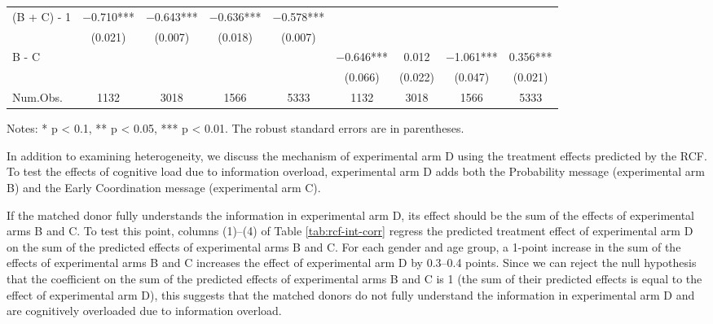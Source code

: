 \documentclass[
  lualatex,
  11pt,
  a4paper
]{article}
\begin{document}
\begin{table}
\begin{threeparttable}
\begin{tabular}[t]{lcccccccc}
\hspace{1em}(B + C) - 1 & \num{-0.710}*** & \num{-0.643}*** & \num{-0.636}*** & \num{-0.578}*** &  &  &  & \\
\hspace{1em} & (\num{0.021}) & (\num{0.007}) & (\num{0.018}) & (\num{0.007}) &  &  &  & \\
\hspace{1em}B - C &  &  &  &  & \num{-0.646}*** & \num{0.012} & \num{-1.061}*** & \num{0.356}***\\
\hspace{1em} &  &  &  &  & (\num{0.066}) & (\num{0.022}) & (\num{0.047}) & (\num{0.021})\\
\midrule
Num.Obs. & \num{1132} & \num{3018} & \num{1566} & \num{5333} & \num{1132} & \num{3018} & \num{1566} & \num{5333}\\
\bottomrule
\end{tabular}
\begin{tablenotes}
\item Notes: * p < 0.1, ** p < 0.05, *** p < 0.01. The robust standard errors are in parentheses. 
\end{tablenotes}
\end{threeparttable}
\end{table}

In addition to examining heterogeneity, we discuss the mechanism of experimental arm D using the treatment effects predicted by the RCF. To test the effects of cognitive load due to information overload, experimental arm D adds both the Probability message (experimental arm B) and the Early Coordination message (experimental arm C).

If the matched donor fully understands the information in experimental arm D, its effect should be the sum of the effects of experimental arms B and C. To test this point, columns (1)--(4) of Table \ref{tab:rcf-int-corr} regress the predicted treatment effect of experimental arm D on the sum of the predicted effects of experimental arms B and C. For each gender and age group, a 1-point increase in the sum of the effects of experimental arms B and C increases the effect of experimental arm D by 0.3--0.4 points. Since we can reject the null hypothesis that the coefficient on the sum of the predicted effects of experimental arms B and C is 1 (the sum of their predicted effects is equal to the effect of experimental arm D), this suggests that the matched donors do not fully understand the information in experimental arm D and are cognitively overloaded due to information overload.
\end{document}
